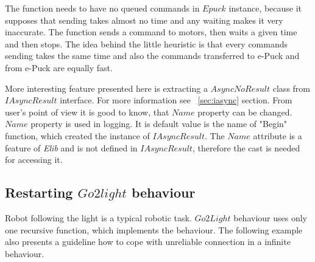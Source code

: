 \documentclass[12pt,notitlepage]{report}
\begin{document}
	The function needs to have no queued commands in $Epuck$ instance, 
	because it supposes that sending takes almost no time and any waiting makes it very inaccurate.
	The function sends a command to motors, then waits a given time and then stops.
	The idea behind the little heuristic is that every commands sending takes the 
	same time and also the commands transferred to e-Puck and from e-Puck are equally fast.

	More interesting feature presented here is extracting a $AsyncNoResult$ class from $IAsyncResult$ interface. 
	For more information see ~\ref{sec:iasync} section.
	From user's point of view it is good to know, that $Name$ property can be changed. $Name$ property is used in logging. 
	It is default value is the name of "Begin" function,
	which created the instance of $IAsyncResult$. The $Name$ attribute is a feature of {\it Elib} 
	and is not defined in $IAsyncResult$, therefore the cast is needed for accessing it.

\subsection{Restarting $Go2light$ behaviour}\label{sec:go2light}
	Robot following the light is a typical robotic task. $Go2Light$ behaviour uses only one recursive function, which implements the behaviour.
	The following example also presents a guideline how to cope with unreliable connection in a infinite behaviour.
\end{document}
